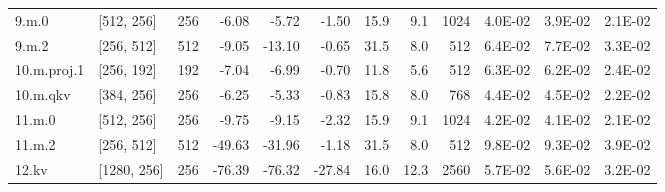 \begin{table}
\begin{tabular}{llrrrrrrrrrr}
9.m.0 & [512, 256] & 256 & {\cellcolor[HTML]{FAFDB8}} \color[HTML]{000000} -6.08 & {\cellcolor[HTML]{FAFDB8}} \color[HTML]{000000} -5.72 & {\cellcolor[HTML]{EEF8A8}} \color[HTML]{000000} -1.50 & 15.9 & 9.1 & 1024 & {\cellcolor[HTML]{EBF7A3}} \color[HTML]{000000} 4.0E-02 & {\cellcolor[HTML]{E9F6A1}} \color[HTML]{000000} 3.9E-02 & {\cellcolor[HTML]{CFEB85}} \color[HTML]{000000} 2.1E-02 \\
9.m.2 & [256, 512] & 512 & {\cellcolor[HTML]{FFFCBA}} \color[HTML]{000000} -9.05 & {\cellcolor[HTML]{FFF3AC}} \color[HTML]{000000} -13.10 & {\cellcolor[HTML]{EBF7A3}} \color[HTML]{000000} -0.65 & 31.5 & 8.0 & 512 & {\cellcolor[HTML]{FFF6B0}} \color[HTML]{000000} 6.4E-02 & {\cellcolor[HTML]{FEE999}} \color[HTML]{000000} 7.7E-02 & {\cellcolor[HTML]{E2F397}} \color[HTML]{000000} 3.3E-02 \\
10.m.proj.1 & [256, 192] & 192 & {\cellcolor[HTML]{FDFEBC}} \color[HTML]{000000} -7.04 & {\cellcolor[HTML]{FDFEBC}} \color[HTML]{000000} -6.99 & {\cellcolor[HTML]{EBF7A3}} \color[HTML]{000000} -0.70 & 11.8 & 5.6 & 512 & {\cellcolor[HTML]{FFF7B2}} \color[HTML]{000000} 6.3E-02 & {\cellcolor[HTML]{FFF8B4}} \color[HTML]{000000} 6.2E-02 & {\cellcolor[HTML]{D5ED88}} \color[HTML]{000000} 2.4E-02 \\
10.m.qkv & [384, 256] & 256 & {\cellcolor[HTML]{FBFDBA}} \color[HTML]{000000} -6.25 & {\cellcolor[HTML]{F8FCB6}} \color[HTML]{000000} -5.33 & {\cellcolor[HTML]{ECF7A6}} \color[HTML]{000000} -0.83 & 15.8 & 8.0 & 768 & {\cellcolor[HTML]{F1F9AC}} \color[HTML]{000000} 4.4E-02 & {\cellcolor[HTML]{F1F9AC}} \color[HTML]{000000} 4.5E-02 & {\cellcolor[HTML]{D1EC86}} \color[HTML]{000000} 2.2E-02 \\
11.m.0 & [512, 256] & 256 & {\cellcolor[HTML]{FFFBB8}} \color[HTML]{000000} -9.75 & {\cellcolor[HTML]{FFFCBA}} \color[HTML]{000000} -9.15 & {\cellcolor[HTML]{EFF8AA}} \color[HTML]{000000} -2.32 & 15.9 & 9.1 & 1024 & {\cellcolor[HTML]{ECF7A6}} \color[HTML]{000000} 4.2E-02 & {\cellcolor[HTML]{ECF7A6}} \color[HTML]{000000} 4.1E-02 & {\cellcolor[HTML]{D1EC86}} \color[HTML]{000000} 2.1E-02 \\
11.m.2 & [256, 512] & 512 & {\cellcolor[HTML]{F36B42}} \color[HTML]{F1F1F1} -49.63 & {\cellcolor[HTML]{FDB96A}} \color[HTML]{000000} -31.96 & {\cellcolor[HTML]{ECF7A6}} \color[HTML]{000000} -1.18 & 31.5 & 8.0 & 512 & {\cellcolor[HTML]{FEC877}} \color[HTML]{000000} 9.8E-02 & {\cellcolor[HTML]{FED27F}} \color[HTML]{000000} 9.3E-02 & {\cellcolor[HTML]{E9F6A1}} \color[HTML]{000000} 3.9E-02 \\
12.kv & [1280, 256] & 256 & {\cellcolor[HTML]{A50026}} \color[HTML]{F1F1F1} -76.39 & {\cellcolor[HTML]{A50026}} \color[HTML]{F1F1F1} -76.32 & {\cellcolor[HTML]{FEC877}} \color[HTML]{000000} -27.84 & 16.0 & 12.3 & 2560 & {\cellcolor[HTML]{FFFDBC}} \color[HTML]{000000} 5.7E-02 & {\cellcolor[HTML]{FFFEBE}} \color[HTML]{000000} 5.6E-02 & {\cellcolor[HTML]{E0F295}} \color[HTML]{000000} 3.2E-02 \\

\end{tabular}
\end{table}

